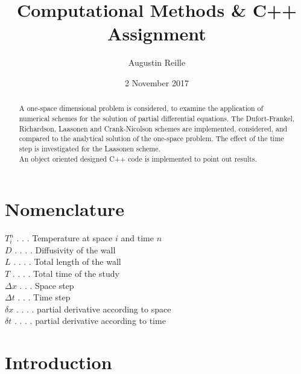 \documentclass{article}
\title{Computational Methods \& C++ Assignment}
\author{Augustin Reille}
\date{2 November 2017}
\begin{document}
    \maketitle

    \begin{abstract}
        A one-space dimensional problem is considered, to examine the application
        of numerical schemes for the solution of partial differential equations.
        The Dufort-Frankel, Richardson, Laasonen and Crank-Nicolson schemes are implemented,
        considered, and compared to the analytical solution of the one-space problem.
        The effect of the time step is investigated for the Laasonen scheme.
        \\ An object oriented designed C++ code is implemented to point out results.
    \end{abstract}

    \newpage
    \tableofcontents

    \newpage
    \listoffigures

    \listoftables

    \section*{Nomenclature}
        $T_i^n$ . . . Temperature at space $i$ and time $n$\\
        $D$ . . . . Diffusivity of the wall\\
        $L$ . . . . Total length of the wall\\
        $T$ . . . . Total time of the study\\
        $\Delta x$ . . . Space step\\
        $\Delta t$ . . . Time step\\
        $\delta x$ . . . . partial derivative according to space\\
        $\delta t$ . . . . partial derivative according to time\\
    \newpage
    \section{Introduction}
\end{document}
